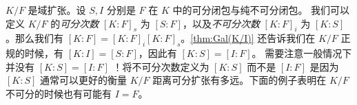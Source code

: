 $K/F$ 是域扩张。设 $S,I$ 分别是 $F$ 在 $K$ 中的可分闭包与纯不可分闭包。
我们可以定义 $K/F$ 的\emph{可分次数} $[K:F]_s$ 为 $[S:F]$，以及\emph{不可分次数}
$[K:F]_i$ 为 $[K:S]$。那么我们有 $[K:F]=[K:F]_i[K:F]_s$。\autoref{thm:Gal(K/I)}
还告诉我们在 $K/F$ 正规的时候，有 $[K:I]=[S:F]$，因此有 $[K:S]=[I:F]$。
需要注意一般情况下并没有 $[K:S]=[I:F]$ ！将不可分次数定义为 $[K:S]$ 而不是 $[I:F]$
是因为 $[K:S]$ 通常可以更好的衡量 $K/F$ 距离可分扩张有多远。下面的例子表明在 $K/F$
不可分的时候也有可能有 $I=F$。






